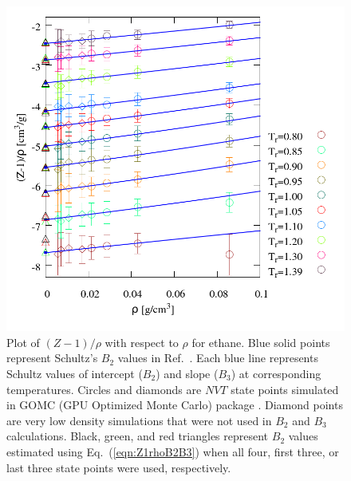 \documentclass[%
 aip,
 jcp,
 sd,%
 amsmath,amssymb,
 reprint,%
]{revtex4-1}
\begin{document}
\begin{figure}
\includegraphics[scale=0.3]{Figures/TraPPE-C2-Z1rho.png}
\caption{Plot of $(Z-1)/\rho$ with respect to $\rho$ for ethane. Blue solid points represent Schultz's $B_2$ values in Ref.~. Each blue line represents Schultz values of intercept ($B_2$) and slope ($B_3$) at corresponding temperatures. Circles and diamonds are $NVT$ state points simulated in GOMC (GPU Optimized Monte Carlo) package \cite{Mick2013}. Diamond points are very low density simulations that were not used in $B_2$ and $B_3$ calculations. Black, green, and red triangles represent $B_2$ values estimated using Eq.~(\ref{eqn:Z1rhoB2B3}) when all four, first three, or last three state points were used, respectively.}
\label{fig:TraPPE-C2-Z1rho}
\end{figure}
\end{document}
